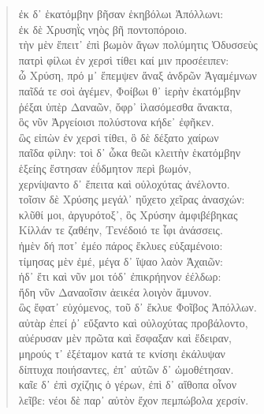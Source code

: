 \begin{Spacing}{1.5}
\begin{verse}
{\large\g ἐκ δ᾽ ἑκατόμβην βῆσαν ἑκηβόλωι Ἀπόλλωνι:  } \\
{\large\g ἐκ δὲ Χρυσηῒς νηὸς βῆ ποντοπόροιο.  } \\
{\large\g τὴν μὲν ἔπειτ᾽ ἐπὶ βωμὸν ἄγων πολύμητις Ὀδυσσεὺς  } \\
{\large\g πατρὶ φίλωι ἐν χερσὶ τίθει καί μιν προσέειπεν:  } \\
{\large\g ὦ Χρύση, πρό μ᾽ ἔπεμψεν ἄναξ ἀνδρῶν Ἀγαμέμνων  } \\
{\large\g παῖδά τε σοὶ ἀγέμεν, Φοίβωι θ᾽ ἱερὴν ἑκατόμβην  } \\
{\large\g ῥέξαι ὑπὲρ Δαναῶν, ὄφρ᾽ ἱλασόμεσθα ἄνακτα,  } \\
{\large\g ὃς νῦν Ἀργείοισι πολύστονα κήδε᾽ ἐφῆκεν.  } \\
{\large\g ὣς εἰπὼν ἐν χερσὶ τίθει, ὃ δὲ δέξατο χαίρων  } \\
{\large\g παῖδα φίλην: τοὶ δ᾽ ὦκα θεῶι κλειτὴν ἑκατόμβην  } \\
{\large\g ἑξείης ἔστησαν ἐΰδμητον περὶ βωμόν,  } \\
{\large\g χερνίψαντο δ᾽ ἔπειτα καὶ οὐλοχύτας ἀνέλοντο.  } \\
{\large\g τοῖσιν δὲ Χρύσης μεγάλ᾽ ηὔχετο χεῖρας ἀνασχών:  } \\
{\large\g  κλῦθί μοι, ἀργυρότοξ᾽, ὃς Χρύσην ἀμφιβέβηκας  } \\
{\large\g  Κίλλάν τε ζαθέην, Τενέδοιό τε ἶφι ἀνάσσεις.  } \\
{\large\g ἠμὲν δή ποτ᾽ ἐμέο πάρος ἔκλυες εὐξαμένοιο:  } \\
{\large\g τίμησας μὲν ἐμέ, μέγα δ᾽ ἴψαο λαὸν Ἀχαιῶν:  } \\
{\large\g ἠδ᾽ ἔτι καὶ νῦν μοι τόδ᾽ ἐπικρήηνον ἐέλδωρ:  } \\
{\large\g ἤδη νῦν Δαναοῖσιν ἀεικέα λοιγὸν ἄμυνον.  } \\
{\large\g ὣς ἔφατ᾽ εὐχόμενος, τοῦ δ᾽ ἔκλυε Φοῖβος Ἀπόλλων.  } \\
{\large\g αὐτὰρ ἐπεί ῥ᾽ εὔξαντο καὶ οὐλοχύτας προβάλοντο,  } \\
{\large\g αὐέρυσαν μὲν πρῶτα καὶ ἔσφαξαν καὶ ἔδειραν,  } \\
{\large\g μηρούς τ᾽ ἐξέταμον κατά τε κνίσηι ἐκάλυψαν  } \\
{\large\g δίπτυχα ποιήσαντες, ἐπ᾽ αὐτῶν δ᾽ ὠμοθέτησαν.  } \\
{\large\g καῖε δ᾽ ἐπὶ σχίζηις ὁ γέρων, ἐπὶ δ᾽ αἴθοπα οἶνον  } \\
{\large\g λεῖβε: νέοι δὲ παρ᾽ αὐτὸν ἔχον πεμπώβολα χερσίν.  } \\

\end{verse}
\end{Spacing}

